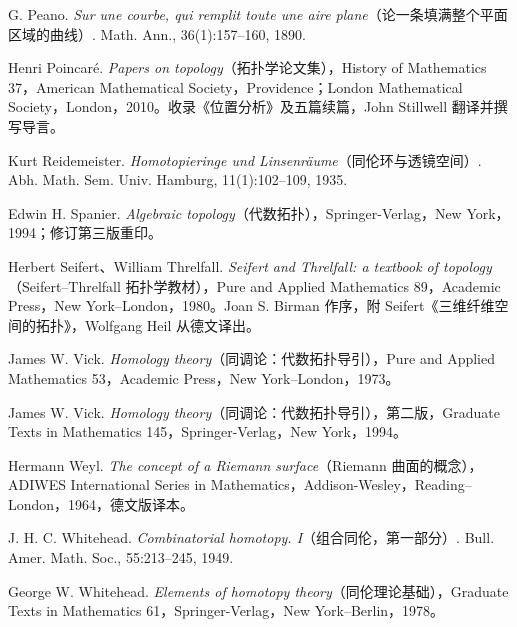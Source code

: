 \begin{description}[style=nextline]
\item[{[Pea90]}] G. Peano. \textit{Sur une courbe, qui remplit toute une aire plane}（论一条填满整个平面区域的曲线）. Math. Ann., 36(1):157--160, 1890.
\item[{[Poi10]}] Henri Poincaré. \textit{Papers on topology}（拓扑学论文集），History of Mathematics 37，American Mathematical Society，Providence；London Mathematical Society，London，2010。收录《位置分析》及五篇续篇，John Stillwell 翻译并撰写导言。
\item[{[Rei35]}] Kurt Reidemeister. \textit{Homotopieringe und Linsenräume}（同伦环与透镜空间）. Abh. Math. Sem. Univ. Hamburg, 11(1):102--109, 1935.
\item[{[Spa94]}] Edwin H. Spanier. \textit{Algebraic topology}（代数拓扑），Springer-Verlag，New York，1994；修订第三版重印。
\item[{[ST80]}] Herbert Seifert、William Threlfall. \textit{Seifert and Threlfall: a textbook of topology}（Seifert--Threlfall 拓扑学教材），Pure and Applied Mathematics 89，Academic Press，New York--London，1980。Joan S. Birman 作序，附 Seifert《三维纤维空间的拓扑》，Wolfgang Heil 从德文译出。
\item[{[Vic73]}] James W. Vick. \textit{Homology theory}（同调论：代数拓扑导引），Pure and Applied Mathematics 53，Academic Press，New York--London，1973。
\item[{[Vic94]}] James W. Vick. \textit{Homology theory}（同调论：代数拓扑导引），第二版，Graduate Texts in Mathematics 145，Springer-Verlag，New York，1994。
\item[{[Wey64]}] Hermann Weyl. \textit{The concept of a Riemann surface}（Riemann 曲面的概念），ADIWES International Series in Mathematics，Addison-Wesley，Reading--London，1964，德文版译本。
\item[{[Whi49]}] J. H. C. Whitehead. \textit{Combinatorial homotopy. I}（组合同伦，第一部分）. Bull. Amer. Math. Soc., 55:213--245, 1949.
\item[{[Whi78]}] George W. Whitehead. \textit{Elements of homotopy theory}（同伦理论基础），Graduate Texts in Mathematics 61，Springer-Verlag，New York--Berlin，1978。
\end{description}
